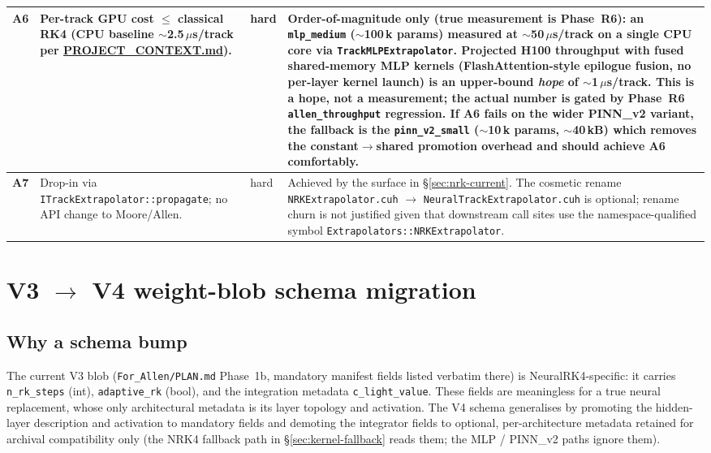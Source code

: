 \documentclass[11pt,a4paper]{article}
\newcommand{\code}[1]{\texttt{#1}}
\begin{document}
\begin{longtable}{p{} p{} p{} p{}}
\textbf{A6} & Per-track GPU cost $\le$ classical RK4 (CPU baseline
              $\sim$2.5\,$\mu$s/track per
              \href{run:../../PROJECT_CONTEXT.md}{PROJECT\_CONTEXT.md}). &
hard &
Order-of-magnitude only (true measurement is Phase~R6): an
\code{mlp\_medium} ($\sim$100\,k params) measured at $\sim$50\,$\mu$s/track
on a single CPU core via
\code{TrackMLPExtrapolator}. Projected H100 throughput with fused
shared-memory MLP kernels (FlashAttention-style epilogue fusion, no
per-layer kernel launch) is an upper-bound \emph{hope} of
$\sim$1\,$\mu$s/track. This is a hope, not a measurement; the actual
number is gated by Phase~R6 \code{allen\_throughput} regression. If A6
fails on the wider PINN\_v2 variant, the fallback is the
\code{pinn\_v2\_small} ($\sim$10\,k params, $\sim$40\,kB) which removes the
constant$\to$shared promotion overhead and should achieve A6
comfortably.\\
\midrule

\textbf{A7} & Drop-in via \code{ITrackExtrapolator::propagate}; no API
              change to Moore/Allen. &
hard &
Achieved by the surface in \S\ref{sec:nrk-current}. The cosmetic rename
\code{NRKExtrapolator.cuh} $\to$ \code{NeuralTrackExtrapolator.cuh} is
optional; rename churn is not justified given that downstream call sites
use the namespace-qualified symbol \code{Extrapolators::NRKExtrapolator}.
\\
\bottomrule
\end{longtable}

\section{V3 $\to$ V4 weight-blob schema migration}
\label{sec:schema}

\subsection{Why a schema bump}

The current V3 blob (\code{For\_Allen/PLAN.md} Phase~1b, mandatory manifest
fields listed verbatim there) is NeuralRK4-specific: it carries
\code{n\_rk\_steps} (int), \code{adaptive\_rk} (bool), and the integration
metadata \code{c\_light\_value}. These fields are meaningless for a true
neural replacement, whose only architectural metadata is its layer
topology and activation. The V4 schema generalises by promoting the
hidden-layer description and activation to mandatory fields and demoting
the integrator fields to optional, per-architecture metadata retained for
archival compatibility only (the NRK4 fallback path in
\S\ref{sec:kernel-fallback} reads them; the MLP / PINN\_v2 paths ignore
them).
\end{document}
